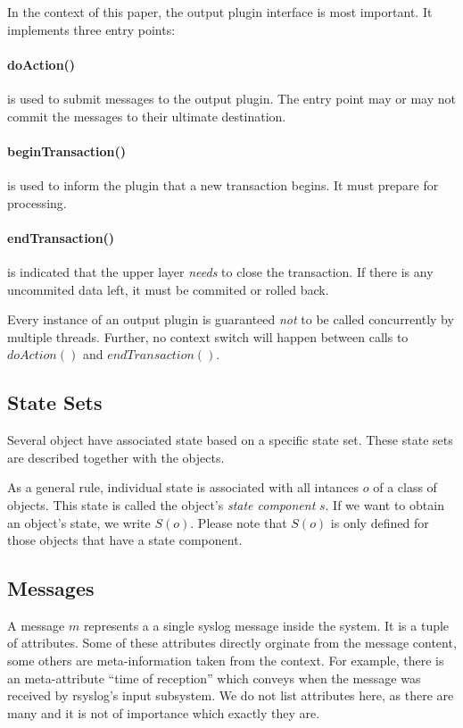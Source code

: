 \documentclass[a4paper,10pt]{article}
\begin{document}
In the context of this paper, the output plugin interface is most important. It implements three entry points:

\paragraph{doAction()}
is used to submit messages to the output plugin. The entry point may or may not commit the messages to their ultimate destination.

\paragraph{beginTransaction()}
is used to inform the plugin that a new transaction begins. It must prepare for processing.

\paragraph{endTransaction()}
is indicated that the upper layer \emph{needs} to close the transaction. If there is any uncommited data left, it must be commited or rolled back.

Every instance of an output plugin is guaranteed \emph{not} to be called concurrently by multiple threads. Further, no context switch will happen between calls to $doAction()$ and $endTransaction()$.

\subsection{State Sets}
Several object have associated state based on a specific state set. These state sets are described together with the objects.

As a general rule, individual state is associated with all intances $o$ of a class of objects. This state is called the object's  \emph{state component} $s$. If we want to obtain an object's state, we write $S(o)$. Please note that $S(o)$ is only defined for those objects that have a state component.

\subsection{Messages} 
A message $m$ represents a a single syslog message inside the system. It is a tuple of attributes. Some of these attributes directly orginate from the message content, some others are meta-information taken from the context. For example, there is an meta-attribute ``time of reception'' which conveys when the message was received by rsyslog's input subsystem. We do not list attributes here, as there are many and it is not of importance which exactly they are.
\end{document}
